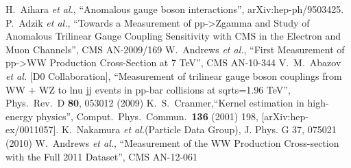 \begin{thebibliography}{99}                                                                                                                               
  H.~Aihara {\it et al.}, ``Anomalous gauge boson interactions'',
  arXiv:hep-ph/9503425.
  P.~Adzik {\it et al.}, ``Towards a Measurement of pp->Zgamma and Study of Anomalous Trilinear Gauge Coupling Sensitivity with CMS in the Electron and Muon Channels'',
  CMS AN-2009/169
  W.~Andrews {\it et al.}, ``First Measurement of pp->WW Production Cross-Section at 7 TeV'',
  CMS AN-10-344
  V.~M.~Abazov {\it et al.}  [D0 Collaboration], ``Measurement of trilinear gauge boson couplings from WW + WZ to lnu jj events in pp-bar collisions at sqrt{s}=1.96 TeV'',
  Phys.\ Rev.\  D {\bf 80}, 053012 (2009)
  K.~S.~Cranmer,``Kernel estimation in high-energy physics'',  Comput.\ Phys.\ Commun.\  {\bf 136} (2001) 198,  [arXiv:hep-ex/0011057].
  K.~Nakamura {\it et al.}(Particle Data Group), J. Phys. G 37, 075021 (2010)
W.~Andrews {\it et al.}, ``Measurement of the WW Production Cross-section with the Full 2011 Dataset'',
CMS AN-12-061
\end{thebibliography}


